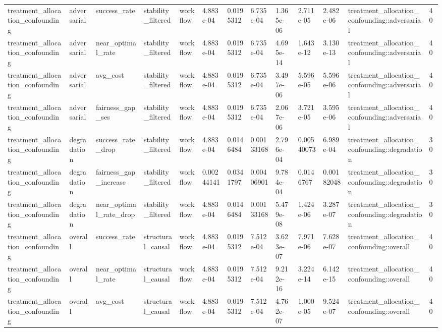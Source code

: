 \begin{tabular}{lllllllllllll}
treatment\_allocation\_confounding & adversarial & success\_rate & stability\_filtered & workflow & 4.883e-04 & 0.0195312 & 6.735e-04 & 1.365e-06 & 2.711e-05 & 2.482e-06 & treatment\_allocation\_confounding::adversarial & 40 \\
treatment\_allocation\_confounding & adversarial & near\_optimal\_rate & stability\_filtered & workflow & 4.883e-04 & 0.0195312 & 6.735e-04 & 4.695e-14 & 1.643e-12 & 3.130e-13 & treatment\_allocation\_confounding::adversarial & 40 \\
treatment\_allocation\_confounding & adversarial & avg\_cost & stability\_filtered & workflow & 4.883e-04 & 0.0195312 & 6.735e-04 & 3.497e-06 & 5.596e-05 & 5.596e-06 & treatment\_allocation\_confounding::adversarial & 40 \\
treatment\_allocation\_confounding & adversarial & fairness\_gap\_ses & stability\_filtered & workflow & 4.883e-04 & 0.0195312 & 6.735e-04 & 2.067e-06 & 3.721e-05 & 3.595e-06 & treatment\_allocation\_confounding::adversarial & 40 \\
treatment\_allocation\_confounding & degradation & success\_rate\_drop & stability\_filtered & workflow & 4.883e-04 & 0.0146484 & 0.00133168 & 2.796e-04 & 0.00540073 & 6.989e-04 & treatment\_allocation\_confounding::degradation & 30 \\
treatment\_allocation\_confounding & degradation & fairness\_gap\_increase & stability\_filtered & workflow & 0.00244141 & 0.0341797 & 0.00406901 & 9.784e-04 & 0.0146767 & 0.00182048 & treatment\_allocation\_confounding::degradation & 30 \\
treatment\_allocation\_confounding & degradation & near\_optimal\_rate\_drop & stability\_filtered & workflow & 4.883e-04 & 0.0146484 & 0.00133168 & 5.479e-08 & 1.424e-06 & 3.287e-07 & treatment\_allocation\_confounding::degradation & 30 \\
treatment\_allocation\_confounding & overall & success\_rate & structural\_causal & workflow & 4.883e-04 & 0.0195312 & 7.512e-04 & 3.623e-07 & 7.971e-06 & 7.628e-07 & treatment\_allocation\_confounding::overall & 40 \\
treatment\_allocation\_confounding & overall & near\_optimal\_rate & structural\_causal & workflow & 4.883e-04 & 0.0195312 & 7.512e-04 & 9.212e-16 & 3.224e-14 & 6.142e-15 & treatment\_allocation\_confounding::overall & 40 \\
treatment\_allocation\_confounding & overall & avg\_cost & structural\_causal & workflow & 4.883e-04 & 0.0195312 & 7.512e-04 & 4.762e-07 & 1.000e-05 & 9.524e-07 & treatment\_allocation\_confounding::overall & 40 \\

\end{tabular}
